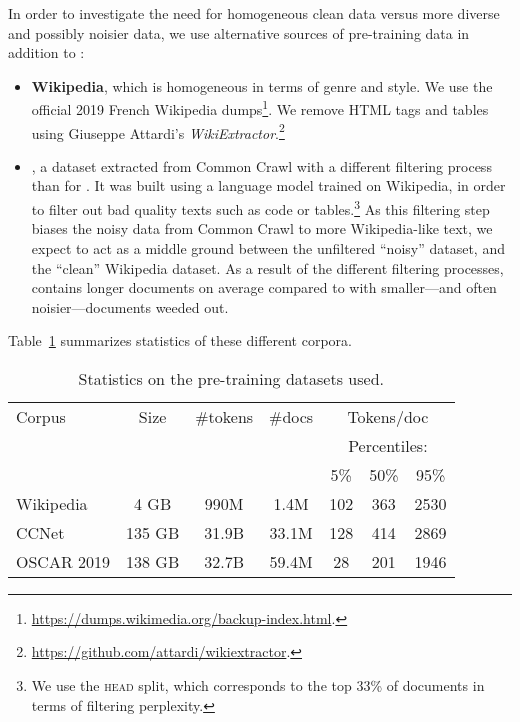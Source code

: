 In order to investigate the need for homogeneous clean data versus more diverse and possibly noisier data, we use alternative sources of pre-training data in addition to :
\begin{itemize}
    \item \textbf{Wikipedia}, which is homogeneous in terms of genre and style. We use the official 2019 French Wikipedia dumps\footnote{ \url{https://dumps.wikimedia.org/backup-index.html}.}. We remove HTML tags and tables using Giuseppe Attardi's  \emph{WikiExtractor}.\footnote{ \url{https://github.com/attardi/wikiextractor}.}
    \item \textbf{\ccnet} \citep{wenzek-etal-2020-ccnet}, a dataset extracted from Common Crawl with a different filtering process than for \oscar. It was built using a language model trained on Wikipedia, in order to filter out bad quality texts such as code or tables.\footnote{We use the \textsc{head} split, which corresponds to the top 33\% of documents in terms of filtering perplexity.} As this filtering step biases the noisy data from Common Crawl to more Wikipedia-like text, we expect \ccnet to act as a middle ground between the unfiltered ``noisy''  dataset, and the ``clean'' Wikipedia dataset. As a result of the different filtering processes, \ccnet contains longer documents on average compared to  with smaller---and often noisier---documents weeded out.
\end{itemize}
Table~\ref{table:corpora_statistics} summarizes statistics of these different corpora.

\begin{table}[ht]
    \centering\small
    \begin{tabular}{lcccccc}
        \toprule
        Corpus     & Size   & \#tokens & \#docs & \multicolumn{3}{c}{Tokens/doc}                 \\
                   &        &          &        & \multicolumn{3}{c}{Percentiles:}               \\
                   &        &          &        & 5\%                              & 50\% & 95\% \\
        \midrule
        Wikipedia  & 4 GB   & 990M     & 1.4M   & 102                              & 363  & 2530 \\
        CCNet      & 135 GB & 31.9B    & 33.1M  & 128                              & 414  & 2869 \\
        OSCAR 2019 & 138 GB & 32.7B    & 59.4M  & 28                               & 201  & 1946 \\
        \bottomrule
    \end{tabular}
    \caption{Statistics on the pre-training datasets used.}
    \label{table:corpora_statistics}
\end{table}

